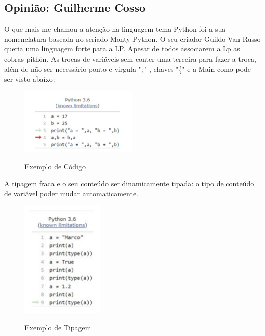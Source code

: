 
\begin{apendicesenv}
\partapendices

\chapter{Opinião: Guilherme Cosso} %
\label{chap:apendiceA}

O que mais me chamou a atenção na linguagem tema Python foi a sua nomenclatura baseada no seriado Monty Python.
O seu criador Guildo Van Russo queria uma linguagem forte para a LP.
Apesar de todos associarem a Lp as cobras pithón.
As trocas de variáveis sem conter uma terceira para fazer a troca, além de não ser necessário ponto e virgula "$;$" , chaves "\{" e a Main como pode ser visto abaixo:

\begin{figure}[!htb]
    \centering
    \caption{Exemplo de Código}
    \includegraphics[width=0.5\textwidth]{./dados/figuras/cosso1.png}
    \label{fig:figura-mountPython}
\end{figure}

A tipagem fraca e o seu conteúdo ser dinamicamente tipada: o tipo de conteúdo de variável poder mudar automaticamente.

\begin{figure}[!htb]
    \centering
    \caption{Exemplo de Tipagem}
    \includegraphics[width=0.35\textwidth]{./dados/figuras/cossin2.png}
    \label{fig:figura-mountPython}
\end{figure}


\end{apendicesenv}
